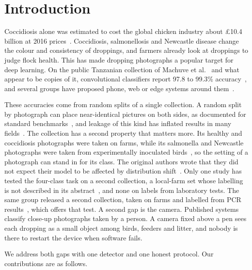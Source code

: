 \section{Introduction}
\label{sec:intro}

Coccidiosis alone was estimated to cost the global chicken industry about \pounds10.4 billion at 2016
prices~\cite{blake2020}. Coccidiosis, salmonellosis and Newcastle disease change the colour and consistency of
droppings, and farmers already look at droppings to judge flock health. This has made dropping photographs a popular
target for deep learning. On the public Tanzanian collection of Machuve et al.~\cite{machuve2022,machuve2021farm} and
what appear to be copies of it, convolutional classifiers report 97.8 to 99.3\%
accuracy~\cite{machuve2022,dhungana2025,degu2023,reyad2024,huda2024}, and several groups have proposed phone, web or
edge systems around them~\cite{degu2023,sakib2026,dhungana2025}.

These accuracies come from random splits of a single collection. A random split by photograph can place
near-identical pictures on both sides, as documented for standard benchmarks~\cite{barz2020}, and leakage of this
kind has inflated results in many fields~\cite{kapoor2023}. The collection has a second property that matters more.
Its healthy and coccidiosis photographs were taken on farms, while its salmonella and Newcastle photographs were taken
from experimentally inoculated birds~\cite{machuve2021farm}, so the setting of a photograph can stand in for its
class. The original authors wrote that they did not expect their model to be affected by distribution
shift~\cite{machuve2022}. Only one study has tested the four-class task on a second collection, a local-farm set
whose labelling is not described in its abstract~\cite{sakib2026}, and none on labels from laboratory tests. The same
group released a second collection, taken on farms and labelled from PCR results~\cite{machuve2021pcr}, which offers
that test. A second gap is the camera. Published systems classify close-up photographs taken by a person. A camera
fixed above a pen sees each dropping as a small object among birds, feeders and litter, and nobody is there to
restart the device when software fails.

We address both gaps with one detector and one honest protocol. Our contributions are as follows.

